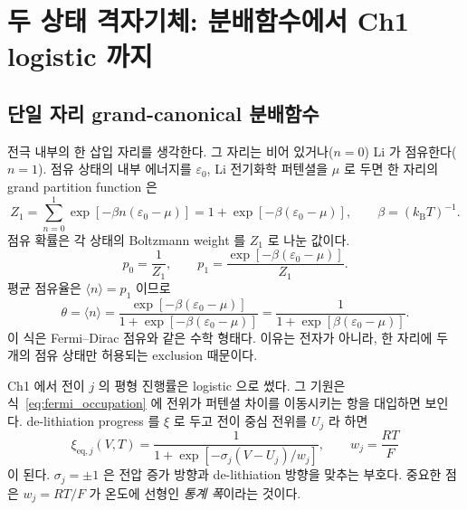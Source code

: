 \documentclass[11pt,a4paper]{article}
\newcommand{\eq}{\mathrm{eq}}
\begin{document}
\section{두 상태 격자기체: 분배함수에서 Ch1 logistic 까지}
\label{sec:lattice_partition}
\subsection{단일 자리 grand-canonical 분배함수}
전극 내부의 한 삽입 자리를 생각한다. 그 자리는 비어 있거나($n=0$) Li 가 점유한다($n=1$).
점유 상태의 내부 에너지를 $\varepsilon_0$, Li 전기화학 퍼텐셜을 $\mu$ 로 두면 한 자리의 grand
partition function 은
\begin{equation}
Z_1 = \sum_{n=0}^{1}\exp[-\beta n(\varepsilon_0-\mu)]
    = 1+\exp[-\beta(\varepsilon_0-\mu)],
\qquad \beta=(k_{\mathrm B}T)^{-1}.
\label{eq:z1}
\end{equation}
점유 확률은 각 상태의 Boltzmann weight 를 $Z_1$ 로 나눈 값이다.
\begin{equation}
p_0=\frac{1}{Z_1},\qquad
p_1=\frac{\exp[-\beta(\varepsilon_0-\mu)]}{Z_1}.
\label{eq:p01}
\end{equation}
평균 점유율은 $\langle n\rangle=p_1$ 이므로
\begin{equation}
\theta=\langle n\rangle
=\frac{\exp[-\beta(\varepsilon_0-\mu)]}{1+\exp[-\beta(\varepsilon_0-\mu)]}
=\frac{1}{1+\exp[\beta(\varepsilon_0-\mu)]}.
\label{eq:fermi_occupation}
\end{equation}
이 식은 Fermi--Dirac 점유와 같은 수학 형태다. 이유는 전자가 아니라, 한 자리에 두 개의 점유 상태만
허용되는 exclusion 때문이다.

Ch1 에서 전이 $j$ 의 평형 진행률은 logistic 으로 썼다. 그 기원은 식~\eqref{eq:fermi_occupation} 에
전위가 퍼텐셜 차이를 이동시키는 항을 대입하면 보인다. de-lithiation progress 를 $\xi$ 로 두고
전이 중심 전위를 $U_j$ 라 하면
\begin{equation}
\xi_{\eq,j}(V,T)
  = \frac{1}{1+\exp[-\sigma_j(V-U_j)/w_j]},
\qquad
w_j=\frac{RT}{F}
\label{eq:ch1_logistic_origin}
\end{equation}
이 된다. $\sigma_j=\pm1$ 은 전압 증가 방향과 de-lithiation 방향을 맞추는 부호다. 중요한 점은
$w_j=RT/F$ 가 온도에 선형인 \emph{통계 폭}이라는 것이다.
\end{document}
